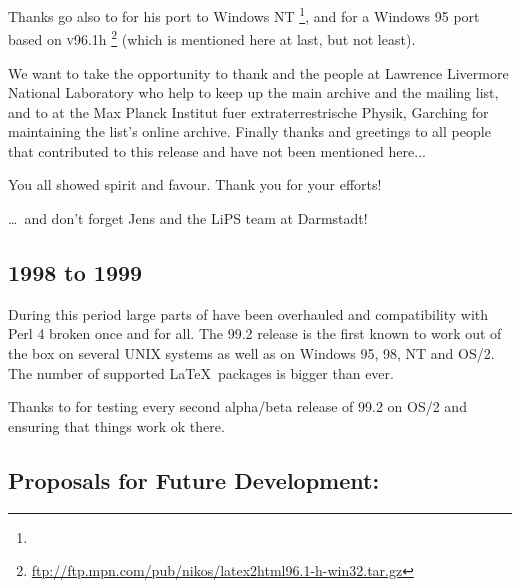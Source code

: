 \smallskip\noindent
Thanks go also to \Popineau{} for his port to Windows NT
\footnote{},
and \NikosDrakos{} for a Windows 95 port based on \textsc{v96.1}h
\footnote{\url{ftp://ftp.mpn.com/pub/nikos/latex2html96.1-h-win32.tar.gz}}
(which is mentioned here at last, but not least).

\medskip\noindent
We want to take the opportunity to thank \Nelson{} and the people at
Lawrence Livermore National Laboratory who help to keep up the
\latextohtml{} main archive and the mailing list, and to \Bohnet{} at
the Max Planck Institut fuer extraterrestrische Physik, Garching for
maintaining the list's online archive.
Finally thanks and greetings to all people that contributed to this
release and have not been mentioned here...

\medskip\noindent
You all showed spirit and favour. Thank you for your efforts!

\medskip
\begin{flushright}
\dots\ and don't forget Jens and the LiPS team at Darmstadt!
\end{flushright}

\subsection*{1998 to 1999}\label{recent99}%
During this period large parts of \latextohtml{} have been overhauled and
compatibility with Perl 4 broken once and for all. The 99.2 release is the
first known to work out of the box on several UNIX systems as well as on 
Windows 95, 98, NT and OS/2. The number of supported \LaTeX\ packages is
bigger than ever.

\medskip\noindent
Thanks to \Perbandt{} for testing every second alpha/beta release of
99.2 on OS/2 and ensuring that things work ok there.


\subsection*{Proposals for Future Development:\label{future}}%




